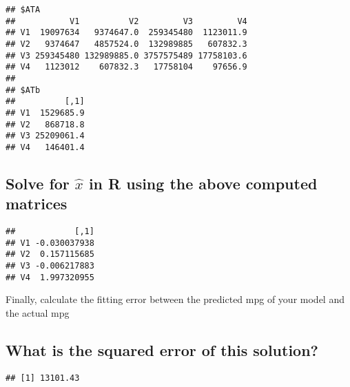 \documentclass[]{article}
\newenvironment{Shaded}{\begin{snugshade}}{\end{snugshade}}
\newcommand{\KeywordTok}[1]{\textcolor[rgb]{0.13,0.29,0.53}{\textbf{{#1}}}}
\newcommand{\DecValTok}[1]{\textcolor[rgb]{0.00,0.00,0.81}{{#1}}}
\newcommand{\StringTok}[1]{\textcolor[rgb]{0.31,0.60,0.02}{{#1}}}
\newcommand{\CommentTok}[1]{\textcolor[rgb]{0.56,0.35,0.01}{\textit{{#1}}}}
\newcommand{\NormalTok}[1]{{#1}}
\begin{document}
\begin{verbatim}
## $ATA
##           V1          V2         V3         V4
## V1  19097634   9374647.0  259345480  1123011.9
## V2   9374647   4857524.0  132989885   607832.3
## V3 259345480 132989885.0 3757575489 17758103.6
## V4   1123012    607832.3   17758104    97656.9
## 
## $ATb
##          [,1]
## V1  1529685.9
## V2   868718.8
## V3 25209061.4
## V4   146401.4
\end{verbatim}

\subsection{\texorpdfstring{Solve for \(\hat{x}\) in R using the above
computed
matrices}{Solve for \textbackslash{}hat\{x\} in R using the above computed matrices}}\label{solve-for-hatx-in-r-using-the-above-computed-matrices-1}

\begin{Shaded}
\end{Shaded}

\begin{verbatim}
##            [,1]
## V1 -0.030037938
## V2  0.157115685
## V3 -0.006217883
## V4  1.997320955
\end{verbatim}

Finally, calculate the fitting error between the predicted mpg of your
model and the actual mpg

\subsection{What is the squared error of this
solution?}\label{what-is-the-squared-error-of-this-solution-1}

\begin{Shaded}
\end{Shaded}

\begin{verbatim}
## [1] 13101.43
\end{verbatim}
\end{document}
